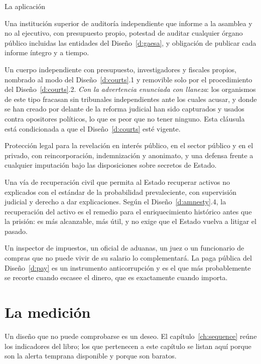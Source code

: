 \begin{design}{La aplicación}
\label{d:enforce}
\begin{rules}
 Una institución superior de auditoría independiente que informe a la asamblea y
no al ejecutivo, con presupuesto propio, potestad de auditar cualquier órgano público incluidas las
entidades del Diseño~\ref{d:gaesa}, y obligación de publicar cada informe íntegro y a tiempo.

 Un cuerpo independiente con presupuesto, investigadores y
fiscales propios, nombrado al modo del Diseño~\ref{d:courts}.1 y removible solo por el
procedimiento del Diseño~\ref{d:courts}.2. \emph{Con la advertencia enunciada con llaneza}: los
organismos de este tipo fracasan sin tribunales independientes ante los cuales acusar, y donde se
han creado por delante de la reforma judicial han sido capturados y usados contra opositores
políticos, lo que es peor que no tener ninguno. Esta cláusula está condicionada a que el
Diseño~\ref{d:courts} esté vigente.

 Protección legal para la revelación en interés público, en el sector público y
en el privado, con reincorporación, indemnización y anonimato, y una defensa frente a cualquier
imputación bajo las disposiciones sobre secretos de Estado.

 Una vía de recuperación civil que permita al Estado recuperar
activos no explicados con el estándar de la probabilidad prevaleciente, con supervisión judicial y
derecho a dar explicaciones. Según el Diseño~\ref{d:amnesty}.4, la recuperación del activo es el
remedio para el enriquecimiento histórico antes que la prisión: es más alcanzable, más útil, y no
exige que el Estado vuelva a litigar el pasado.

 Un inspector de impuestos, un oficial de aduanas, un juez o un
funcionario de compras que no puede vivir de su salario lo complementará. La paga pública del
Diseño~\ref{d:pay} es un instrumento anticorrupción y es el que más probablemente se recorte cuando
escasee el dinero, que es exactamente cuando importa.
\end{rules}
\end{design}

\section{La medición}

Un diseño que no puede comprobarse es un deseo. El capítulo~\ref{ch:sequence} reúne los
indicadores del libro; los que pertenecen a este capítulo se listan aquí porque son la alerta
temprana disponible y porque son baratos.

